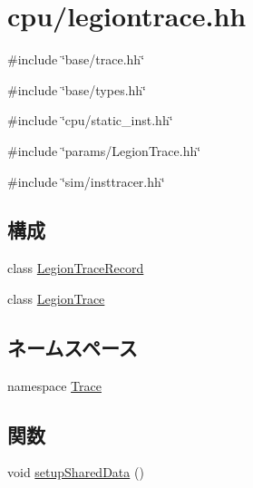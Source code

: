 \hypertarget{legiontrace_8hh}{
\section{cpu/legiontrace.hh}
\label{legiontrace_8hh}
}
{\ttfamily \#include \char`\"{}base/trace.hh\char`\"{}}\par
{\ttfamily \#include \char`\"{}base/types.hh\char`\"{}}\par
{\ttfamily \#include \char`\"{}cpu/static\_\-inst.hh\char`\"{}}\par
{\ttfamily \#include \char`\"{}params/LegionTrace.hh\char`\"{}}\par
{\ttfamily \#include \char`\"{}sim/insttracer.hh\char`\"{}}\par
\subsection*{構成}
\begin{DoxyCompactItemize}
\item 
class \hyperlink{classTrace_1_1LegionTraceRecord}{LegionTraceRecord}
\item 
class \hyperlink{classTrace_1_1LegionTrace}{LegionTrace}
\end{DoxyCompactItemize}
\subsection*{ネームスペース}
\begin{DoxyCompactItemize}
\item 
namespace \hyperlink{namespaceTrace}{Trace}
\end{DoxyCompactItemize}
\subsection*{関数}
\begin{DoxyCompactItemize}
\item 
void \hyperlink{namespaceTrace_a577907a8a8a528fe0e43d77c4123492d}{setupSharedData} ()
\end{DoxyCompactItemize}
